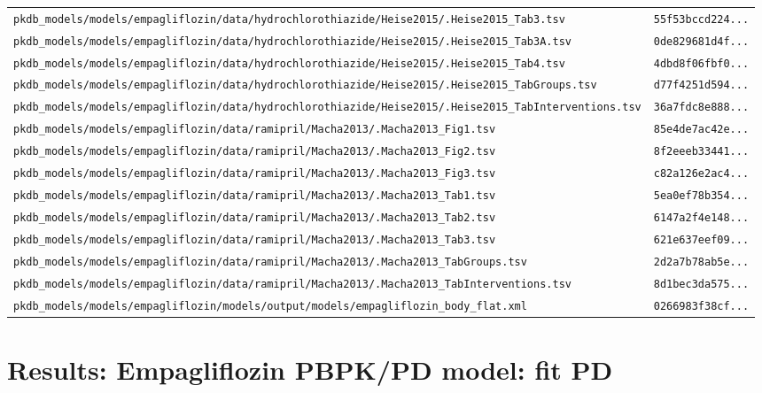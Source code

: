 \begin{longtable}{ll}
\texttt{pkdb\_models/models/empagliflozin/data/hydrochlorothiazide/Heise2015/.Heise2015\_Tab3.tsv} & \texttt{55f53bccd224...} \\
\texttt{pkdb\_models/models/empagliflozin/data/hydrochlorothiazide/Heise2015/.Heise2015\_Tab3A.tsv} & \texttt{0de829681d4f...} \\
\texttt{pkdb\_models/models/empagliflozin/data/hydrochlorothiazide/Heise2015/.Heise2015\_Tab4.tsv} & \texttt{4dbd8f06fbf0...} \\
\texttt{pkdb\_models/models/empagliflozin/data/hydrochlorothiazide/Heise2015/.Heise2015\_TabGroups.tsv} & \texttt{d77f4251d594...} \\
\texttt{pkdb\_models/models/empagliflozin/data/hydrochlorothiazide/Heise2015/.Heise2015\_TabInterventions.tsv} & \texttt{36a7fdc8e888...} \\
\texttt{pkdb\_models/models/empagliflozin/data/ramipril/Macha2013/.Macha2013\_Fig1.tsv} & \texttt{85e4de7ac42e...} \\
\texttt{pkdb\_models/models/empagliflozin/data/ramipril/Macha2013/.Macha2013\_Fig2.tsv} & \texttt{8f2eeeb33441...} \\
\texttt{pkdb\_models/models/empagliflozin/data/ramipril/Macha2013/.Macha2013\_Fig3.tsv} & \texttt{c82a126e2ac4...} \\
\texttt{pkdb\_models/models/empagliflozin/data/ramipril/Macha2013/.Macha2013\_Tab1.tsv} & \texttt{5ea0ef78b354...} \\
\texttt{pkdb\_models/models/empagliflozin/data/ramipril/Macha2013/.Macha2013\_Tab2.tsv} & \texttt{6147a2f4e148...} \\
\texttt{pkdb\_models/models/empagliflozin/data/ramipril/Macha2013/.Macha2013\_Tab3.tsv} & \texttt{621e637eef09...} \\
\texttt{pkdb\_models/models/empagliflozin/data/ramipril/Macha2013/.Macha2013\_TabGroups.tsv} & \texttt{2d2a7b78ab5e...} \\
\texttt{pkdb\_models/models/empagliflozin/data/ramipril/Macha2013/.Macha2013\_TabInterventions.tsv} & \texttt{8d1bec3da575...} \\
\texttt{pkdb\_models/models/empagliflozin/models/output/models/empagliflozin\_body\_flat.xml} & \texttt{0266983f38cf...} \\
\end{longtable}

\section{Results: Empagliflozin PBPK/PD model: fit PD}

